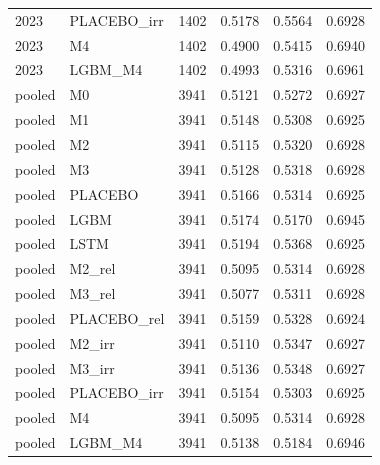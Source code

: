 \begin{tabular}{llrrrr}
2023 & PLACEBO\_irr & 1402 & 0.5178 & 0.5564 & 0.6928 \\
2023 & M4 & 1402 & 0.4900 & 0.5415 & 0.6940 \\
2023 & LGBM\_M4 & 1402 & 0.4993 & 0.5316 & 0.6961 \\
pooled & M0 & 3941 & 0.5121 & 0.5272 & 0.6927 \\
pooled & M1 & 3941 & 0.5148 & 0.5308 & 0.6925 \\
pooled & M2 & 3941 & 0.5115 & 0.5320 & 0.6928 \\
pooled & M3 & 3941 & 0.5128 & 0.5318 & 0.6928 \\
pooled & PLACEBO & 3941 & 0.5166 & 0.5314 & 0.6925 \\
pooled & LGBM & 3941 & 0.5174 & 0.5170 & 0.6945 \\
pooled & LSTM & 3941 & 0.5194 & 0.5368 & 0.6925 \\
pooled & M2\_rel & 3941 & 0.5095 & 0.5314 & 0.6928 \\
pooled & M3\_rel & 3941 & 0.5077 & 0.5311 & 0.6928 \\
pooled & PLACEBO\_rel & 3941 & 0.5159 & 0.5328 & 0.6924 \\
pooled & M2\_irr & 3941 & 0.5110 & 0.5347 & 0.6927 \\
pooled & M3\_irr & 3941 & 0.5136 & 0.5348 & 0.6927 \\
pooled & PLACEBO\_irr & 3941 & 0.5154 & 0.5303 & 0.6925 \\
pooled & M4 & 3941 & 0.5095 & 0.5314 & 0.6928 \\
pooled & LGBM\_M4 & 3941 & 0.5138 & 0.5184 & 0.6946 \\
\bottomrule
\end{tabular}

